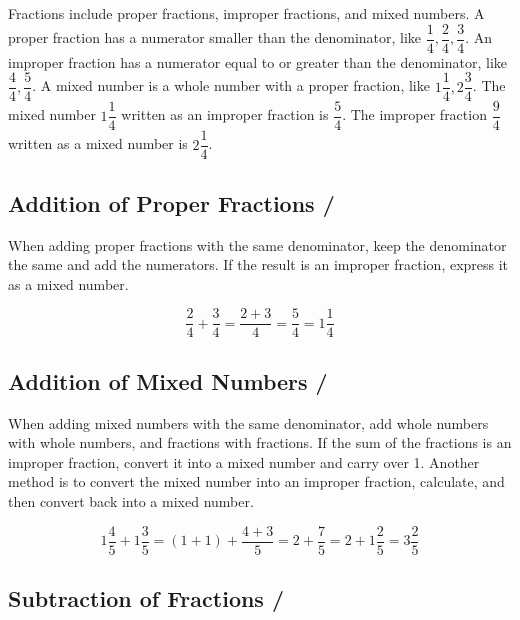 Fractions include proper fractions, improper fractions, and mixed numbers.  
A proper fraction has a numerator smaller than the denominator, like $\dfrac{1}{4}, \dfrac{2}{4}, \dfrac{3}{4}$.  
An improper fraction has a numerator equal to or greater than the denominator, like $\dfrac{4}{4}, \dfrac{5}{4}$.  
A mixed number is a whole number with a proper fraction, like $1 \dfrac{1}{4}, 2 \dfrac{3}{4}$.  
The mixed number $1 \dfrac{1}{4}$ written as an improper fraction is $\dfrac{5}{4}$.  
The improper fraction $\dfrac{9}{4}$ written as a mixed number is $2 \dfrac{1}{4}$.

\subsection*{Addition of Proper Fractions / }

When adding proper fractions with the same denominator, keep the denominator the same and add the numerators.  
If the result is an improper fraction, express it as a mixed number.

\[
\dfrac{2}{4} + \dfrac{3}{4} = \dfrac{2+3}{4} = \dfrac{5}{4} = 1 \dfrac{1}{4}
\]


\subsection*{Addition of Mixed Numbers / }

When adding mixed numbers with the same denominator, add whole numbers with whole numbers, and fractions with fractions.  
If the sum of the fractions is an improper fraction, convert it into a mixed number and carry over 1.  
Another method is to convert the mixed number into an improper fraction, calculate, and then convert back into a mixed number.

\[
1 \dfrac{4}{5} + 1 \dfrac{3}{5} 
= (1+1) + \dfrac{4+3}{5} 
= 2 + \dfrac{7}{5} 
= 2 + 1 \dfrac{2}{5} 
= 3 \dfrac{2}{5}
\]


\subsection*{Subtraction of Fractions / }

